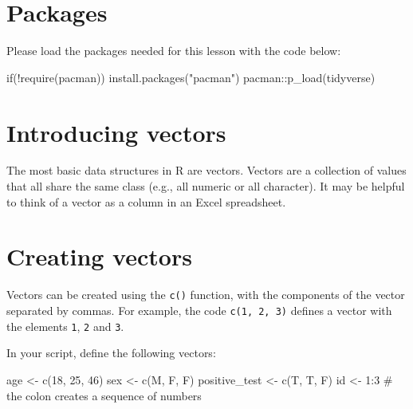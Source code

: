 \documentclass[
  letterpaper,
  DIV=11,
  numbers=noendperiod]{scrreprt}
\newenvironment{Shaded}{\begin{snugshade}}{\end{snugshade}}
\newcommand{\CommentTok}[1]{\textcolor[rgb]{0.37,0.37,0.37}{#1}}
\newcommand{\ControlFlowTok}[1]{\textcolor[rgb]{0.00,0.23,0.31}{#1}}
\newcommand{\DecValTok}[1]{\textcolor[rgb]{0.68,0.00,0.00}{#1}}
\newcommand{\FunctionTok}[1]{\textcolor[rgb]{0.28,0.35,0.67}{#1}}
\newcommand{\NormalTok}[1]{\textcolor[rgb]{0.00,0.23,0.31}{#1}}
\newcommand{\OtherTok}[1]{\textcolor[rgb]{0.00,0.23,0.31}{#1}}
\newcommand{\SpecialCharTok}[1]{\textcolor[rgb]{0.37,0.37,0.37}{#1}}
\newcommand{\StringTok}[1]{\textcolor[rgb]{0.13,0.47,0.30}{#1}}
\begin{document}
\hypertarget{packages-3}{%
\section{Packages}\label{packages-3}}

Please load the packages needed for this lesson with the code below:

\begin{Shaded}
\begin{Highlighting}[]
\ControlFlowTok{if}\NormalTok{(}\SpecialCharTok{!}\FunctionTok{require}\NormalTok{(pacman)) }\FunctionTok{install.packages}\NormalTok{(}\StringTok{"pacman"}\NormalTok{)}
\NormalTok{pacman}\SpecialCharTok{::}\FunctionTok{p\_load}\NormalTok{(tidyverse)}
\end{Highlighting}
\end{Shaded}

\hypertarget{introducing-vectors}{%
\section{Introducing vectors}\label{introducing-vectors}}

The most basic data structures in R are vectors. Vectors are a
collection of values that all share the same class (e.g., all numeric or
all character). It may be helpful to think of a vector as a column in an
Excel spreadsheet.

\hypertarget{creating-vectors}{%
\section{Creating vectors}\label{creating-vectors}}

Vectors can be created using the \texttt{c()} function, with the
components of the vector separated by commas. For example, the code
\texttt{c(1,\ 2,\ 3)} defines a vector with the elements \texttt{1},
\texttt{2} and \texttt{3}.

In your script, define the following vectors:

\begin{Shaded}
\begin{Highlighting}[]
\NormalTok{age }\OtherTok{\textless{}{-}} \FunctionTok{c}\NormalTok{(}\DecValTok{18}\NormalTok{, }\DecValTok{25}\NormalTok{, }\DecValTok{46}\NormalTok{)}
\NormalTok{sex }\OtherTok{\textless{}{-}} \FunctionTok{c}\NormalTok{(}\StringTok{\textquotesingle{}M\textquotesingle{}}\NormalTok{, }\StringTok{\textquotesingle{}F\textquotesingle{}}\NormalTok{, }\StringTok{\textquotesingle{}F\textquotesingle{}}\NormalTok{)}
\NormalTok{positive\_test }\OtherTok{\textless{}{-}} \FunctionTok{c}\NormalTok{(T, T, F)}
\NormalTok{id }\OtherTok{\textless{}{-}} \DecValTok{1}\SpecialCharTok{:}\DecValTok{3} \CommentTok{\# the colon creates a sequence of numbers}
\end{Highlighting}
\end{Shaded}
\end{document}
